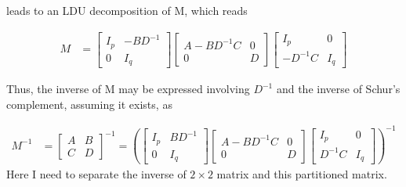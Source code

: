 leads to an LDU decomposition of M, which reads

\begin{align*}
	M &= \begin{bmatrix}
	I_{p} & -BD^{-1} \\
	0 & I_{q}
\end{bmatrix}  \begin{bmatrix}
		A - BD^{-1}C & 0 \\
		0 & D
	\end{bmatrix}  \begin{bmatrix}
	I_{p} & 0 \\
	-D^{-1}C & I_{q}
\end{bmatrix}
\end{align*}

Thus, the inverse of M may be expressed involving $D^{-1}$ and the inverse of Schur's complement, assuming it exists, as

\begin{align*}
	M^{-1} &= \begin{bmatrix}
		A & B \\
		C & D
	\end{bmatrix}^{-1} = \left(\begin{bmatrix}
	I_{p} & BD^{-1} \\
	0 & I_{q}
\end{bmatrix}  \begin{bmatrix}
A - BD^{-1}C & 0 \\
0 & D
\end{bmatrix}  \begin{bmatrix}
I_{p} & 0 \\
D^{-1}C & I_{q}
\end{bmatrix} \right)^{-1} 
\end{align*}
Here I need to separate the inverse of $2 \times 2$ matrix and this partitioned matrix. 

